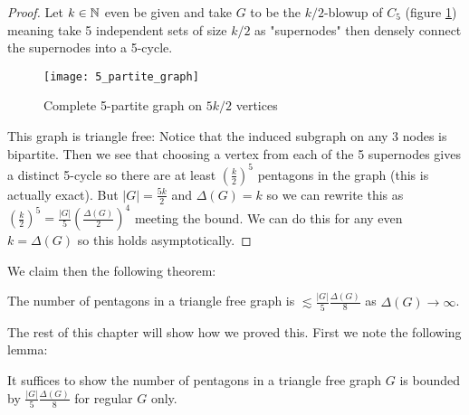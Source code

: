 \begin{proof}
    Let $k\in\mathbb{N}$ even be given and take $G$ to be the $k/2$-blowup of $C_5$
    (figure \ref{fig:5_partite_graph}) meaning take 5 independent sets of size $k/2$ as
    "supernodes" then densely connect the supernodes into a 5-cycle.
    \begin{figure}[ht]
        \centering
        \texttt{[image: 5\_partite\_graph]}
        \caption{Complete 5-partite graph on $5k/2$ vertices}
        \label{fig:5_partite_graph}
    \end{figure}
    This graph is triangle free: Notice that the induced subgraph on any 3 nodes is bipartite.
    Then we see that choosing
    a vertex from each of the 5 supernodes gives a distinct 5-cycle so there are at
    least $\left(\frac{k}{2}\right)^5$ pentagons in the graph (this is actually exact). But
    $|G|=\frac{5k}{2}$ and $\Delta(G)=k$ so we can rewrite this as
    $\left(\frac{k}{2}\right)^5 = \frac{|G|}{5}\left(\frac{\Delta(G)}{2}\right)^4$ meeting
    the bound. We can do this for any even $k=\Delta(G)$ so this holds asymptotically.
\end{proof}

We claim then the following theorem:
\begin{theorem}
    The number of pentagons in a triangle free graph is
    $\lesssim \frac{|G|}{5}\frac{\Delta(G)}{8}$
    as $\Delta(G) \to \infty$.
\end{theorem}

The rest of this chapter will show how we proved this. First we note the
following lemma:

\begin{lemma}
    It suffices to show the number of pentagons in a triangle free graph
    $G$ is bounded by $\frac{|G|}{5}\frac{\Delta(G)}{8}$ for regular $G$ only.
\end{lemma}

